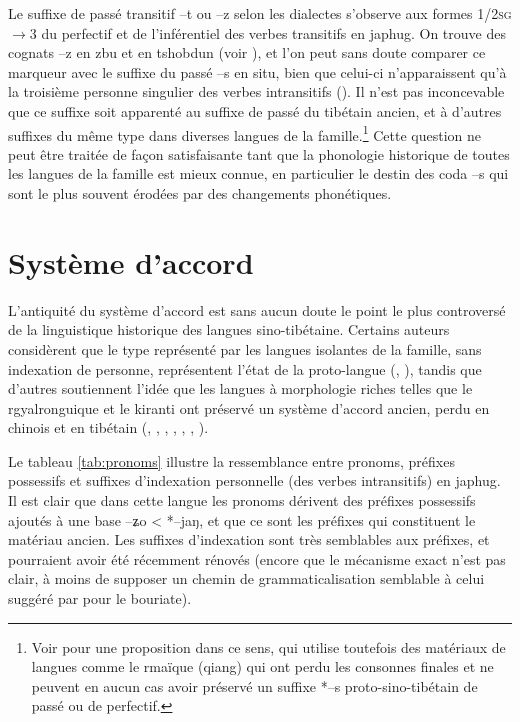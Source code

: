 \documentclass[oldfontcommands,oneside,a4paper,11pt]{article}
\newcommand{\ipa}[1]{{\phon \mbox{#1}}} %
\begin{document}
Le suffixe de passé transitif \ipa{--t} ou \ipa{--z} selon les dialectes s'observe aux formes \textsc{1/2sg}$\rightarrow$3 du perfectif et de l'inférentiel  des verbes transitifs en japhug. On trouve des cognats \ipa{--z} en zbu et en tshobdun (voir \citealt{jackson14morpho}), et l'on peut sans doute comparer ce marqueur avec le suffixe du passé \ipa{--s} en situ, bien que celui-ci n'apparaissent qu'à la troisième personne singulier des verbes intransitifs (\citealt{linyj03tense}). Il n'est pas inconcevable que ce suffixe soit apparenté au suffixe de passé du tibétain ancien, et à d'autres suffixes du même type dans diverses langues de la famille.\footnote{Voir \citet{huangbf97s.houzhui} pour une proposition dans ce sens, qui utilise toutefois des matériaux de langues comme le rmaïque (qiang) qui ont perdu les consonnes finales et ne peuvent en aucun cas avoir préservé un suffixe *--s proto-sino-tibétain de passé ou de perfectif.} Cette question ne peut être traitée de façon satisfaisante tant que la phonologie historique de toutes les langues de la famille est mieux connue, en particulier le destin des coda --s qui sont le plus souvent érodées par des changements phonétiques.

\section{Système d'accord}

L'antiquité du système d'accord est sans aucun doute le point le plus controversé de la linguistique historique des langues sino-tibétaine. Certains auteurs considèrent que le type représenté par les langues isolantes de la famille, sans indexation de personne, représentent l'état de la proto-langue (\citealt{lapolla92}, \citealt{lapolla03, lapolla12comments}), tandis que d'autres soutiennent l'idée que les langues à morphologie riches telles que le rgyalronguique et le kiranti ont préservé un système d'accord ancien, perdu en chinois et en tibétain (\citealt{driem93agreement}, \citealt{delancey89agreement}, \citealt{delancey10agreement}, \citealt{delancey11prefixes},  \citealt{delancey14second}, \citealt{jacques10zos}, \citealt{jacques12agreement}).
   

Le tableau \ref{tab:pronoms} illustre la ressemblance entre pronoms, préfixes possessifs et suffixes d'indexation personnelle (des verbes intransitifs) en japhug. Il est clair que dans cette langue les pronoms dérivent des préfixes possessifs ajoutés à une base \ipa{--ʑo} < *\ipa{--jaŋ}, et que ce sont les préfixes qui constituent le matériau ancien. Les suffixes d'indexation sont très semblables aux préfixes, et pourraient avoir été récemment rénovés (encore que le mécanisme exact n'est pas clair, à moins de supposer un chemin de grammaticalisation semblable à celui  suggéré par \citealt{comrie80morpho} pour le bouriate).
   
\end{document}
